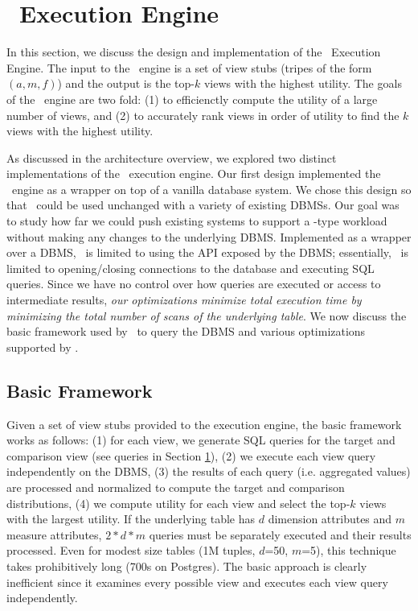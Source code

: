 \section{\SeeDB\ Execution Engine}
In this section, we discuss the design and implementation of the \SeeDB\
Execution Engine. 
The input to the \SeeDB\ engine is a set of view stubs (tripes of the form
$(a, m, f)$) and the output is the top-$k$ views with the highest utility.
The goals of the \SeeDB\ engine are two fold:
(1) to efficienctly compute the utility of a large number of views, and (2) to accurately rank views in order of
utility to find the $k$ views with the highest utility.


As discussed in the architecture overview, we explored two distinct
implementations of the \SeeDB\ execution engine.
Our first design implemented the \SeeDB\ engine as a wrapper on top of a
vanilla database system.
We chose this design so that \SeeDB\ could be used unchanged with a variety of
existing DBMSs.
Our goal was to study how far we could push existing systems to
support a \SeeDB-type workload without making any changes to the underlying
DBMS.
Implemented as a wrapper over a DBMS, \SeeDB\ is limited to using the API
exposed by the DBMS; essentially, \SeeDB\ is limited to opening/closing connections to the
database and executing SQL queries. 
Since we have no control over how queries are executed or access to intermediate
results, {\it our optimizations minimize total execution time by minimizing the
total number of scans of the underlying table}.
We now discuss the basic framework used by \SeeDB\ to query the DBMS and various
optimizations supported by \SeeDB.

\subsection{Basic Framework}
\label{sec:basic_framework}
Given a set of view stubs provided to the execution engine, the basic framework
works as follows: 
(1) for each view, we generate SQL queries for the target and
comparison view (see queries in Section \ref{}), 
(2) we execute each view query independently on the DBMS, 
(3) the results of each query (i.e. aggregated values) are processed and
normalized to compute the target and comparison distributions, 
(4) we compute utility for each view and select the top-$k$ views with the largest utility.
If the underlying table has $d$ dimension attributes and $m$ measure attributes,
$2\ast d \ast m$ queries must be separately executed and their results
processed. Even for modest size tables (1M tuples, $d$=50, $m$=5), this
technique takes prohibitively long (700s on Postgres). The basic approach is
clearly inefficient since it examines every possible view and executes each view
query independently.

